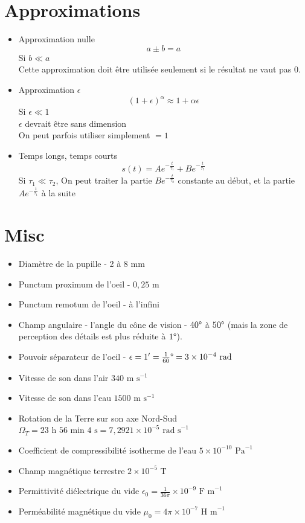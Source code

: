 \documentclass[openany]{book}
\begin{document}
\section{Approximations}
\begin{itemize}
    \item Approximation nulle
    \[ a \pm b = a\]
    \noindent Si $ b \ll a $ \\
    \noindent Cette approximation doit être utilisée seulement si le résultat ne vaut pas 0. 
    \item Approximation $ \epsilon $
    \[ (1+\epsilon)^{\alpha} \approx 1+\alpha\epsilon \]
    \noindent Si $ \epsilon \ll 1 $ \\
    \noindent $\epsilon$ devrait être sans dimension  \\
    \noindent On peut parfois utiliser simplement $=1$
    \item Temps longs, temps courts
    \[ s(t) = Ae^{-\frac{t}{\tau_1}} + Be^{-\frac{t}{\tau_2}} \]
    Si $ \tau_1 \ll \tau_2 $, On peut traiter la partie $Be^{-\frac{t}{\tau_2}}$ constante au début, et la partie $Ae^{-\frac{t}{\tau_1}}$ à la suite
\end{itemize}

\section{Misc}
\begin{itemize}
    \item Diamètre de la pupille - 2 à 8 mm
    \item Punctum proximum de l'oeil - $ 0,25 \text{ m} $
    \item Punctum remotum de l'oeil - à l'infini
    \item Champ angulaire - l'angle du cône de vision - $ 40 \degree $  à $ 50 \degree $ (mais la zone de perception des détails est plus réduite à $ 1 \degree $).
    \item Pouvoir séparateur de l'oeil - $ \epsilon = 1' = \frac{1}{60} \degree = 3 \times 10^{-4} \text{ rad} $
    \item Vitesse de son dans l'air $340 \text{ m s}^{-1}$
    \item Vitesse de son dans l'eau $1500 \text{ m s}^{-1}$
    \item Rotation de la Terre sur son axe Nord-Sud $ \Omega_T = 23 \text{ h } 56 \text{ min } 4 \text{ s} = 7,2921 \times 10^{-5} \text{ rad s}^{-1} $
    \item Coefficient de compressibilité isotherme de l'eau $5 \times 10^{-10} \text{ Pa}^{-1}$
    \item Champ magnétique terrestre $2 \times 10^{-5} \text{ T}$
    \item Permittivité diélectrique du vide $\epsilon_0 = \frac{1}{36 \pi} \times 10^{-9} \text{ F m}^{-1}$
    \item Perméabilité magnétique du vide $\mu_0 = 4 \pi \times 10^{-7} \text{ H m}^{-1}$
\end{itemize}
\end{document}
